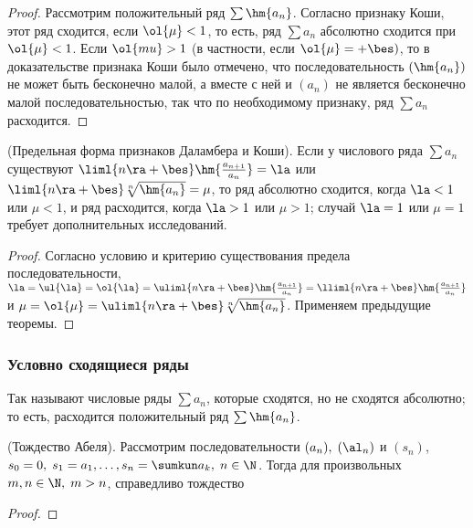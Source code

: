 \documentclass[a4paper]{article}
\newenvironment{imp*}{\par\vskip\theoremskip\textbf{Следствие.}\normalfont \itshape}{\par\vskip\theoremskip}
\begin{document}
\begin{proof}
Рассмотрим положительный ряд $\sum \hm{a_n}$. Согласно признаку
Коши, этот ряд сходится, если $\ol{\mu}<1$, то есть, ряд $\sum a_n$
абсолютно сходится при $\ol{\mu}<1$. Если $\ol{mu}>1$ (в частности,
если $\ol{\mu}=+\bes)$, то в доказательстве признака Коши было
отмечено, что последовательность $(\hm{a_n})$ не может быть
бесконечно малой, а вместе с ней и $(a_n)$ не является бесконечно
малой последовательностью, так что по необходимому признаку, ряд
$\sum a_n$ расходится.
\end{proof}

\begin{imp*}
(Предельная форма признаков Даламбера и Коши). Если у числового ряда
$\sum a_n$ существуют $\liml{n\ra+\bes}
\hm{\frac{a_{n+1}}{a_n}}=\la$ или
$\liml{n\ra+\bes}\sqrt[n]{\hm{a_n}}=\mu$, то ряд абсолютно сходится,
когда $\la<1$ или $\mu<1$, и ряд расходится, когда $\la>1$ или
$\mu>1$; случай $\la=1$ или $\mu=1$ требует дополнительных
исследований.
\end{imp*}

\begin{proof}
Согласно условию и критерию существования предела
последовательности, $\la = \ul{\la} = \ol{\la} = \uliml{n\ra+\bes}
\hm{\frac{a_{n+1}}{a_n}} =
\lliml{n\ra+\bes}\hm{\frac{a_{n+1}}{a_n}}$ и $\mu=\ol{\mu} =
\uliml{n\ra+\bes} \sqrt[n]{\hm{a_n}}$. Применяем предыдущие теоремы.
\end{proof}

\subsubsection{Условно сходящиеся ряды}

Так называют числовые ряды $\sum a_n$, которые сходятся, но не
сходятся абсолютно; то есть, расходится положительный ряд
$\sum\hm{a_n}$.

\begin{theorem}
(Тождество Абеля). Рассмотрим последовательности $(a_n), \; (\al_n)$
и $(s_n)$, $s_0=0, \; s_1=a_1, \ldots, s_n = \sumkun a_k, \;
n\in\N$. Тогда для произвольных $m,n\in\N, \; m>n$, справедливо
тождество 
\end{theorem}

\begin{proof}
\end{proof}
\end{document}
